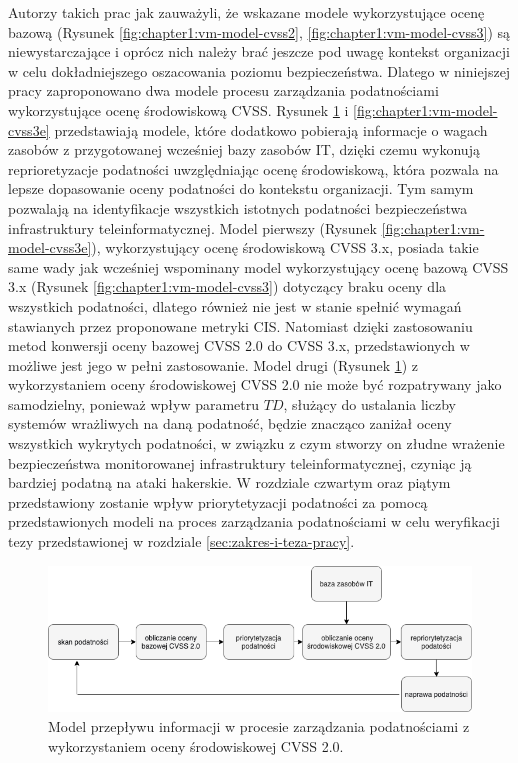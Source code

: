 \bigbreak
Autorzy takich prac jak \cite{fruhwirth2009improving, wang2015vulnerability, gallon2010impact} zauważyli, że wskazane modele wykorzystujące ocenę bazową (Rysunek \ref{fig:chapter1:vm-model-cvss2}, \ref{fig:chapter1:vm-model-cvss3}) są niewystarczające i oprócz nich należy brać jeszcze pod uwagę kontekst organizacji w celu dokładniejszego oszacowania poziomu bezpieczeństwa. Dlatego w niniejszej pracy zaproponowano dwa modele procesu zarządzania podatnościami wykorzystujące ocenę środowiskową CVSS. Rysunek \ref{fig:chapter1:vm-model-cvss2e} i \ref{fig:chapter1:vm-model-cvss3e} przedstawiają modele, które dodatkowo pobierają informacje o wagach zasobów z przygotowanej wcześniej bazy zasobów IT, dzięki czemu wykonują reprioretyzacje podatności uwzględniając ocenę środowiskową, która pozwala na lepsze dopasowanie oceny podatności do kontekstu organizacji. Tym samym pozwalają na identyfikacje wszystkich istotnych podatności bezpieczeństwa infrastruktury teleinformatycznej. Model pierwszy (Rysunek \ref{fig:chapter1:vm-model-cvss3e}), wykorzystujący ocenę środowiskową CVSS 3.x, posiada takie same wady jak wcześniej wspominany model wykorzystujący ocenę bazową CVSS 3.x (Rysunek \ref{fig:chapter1:vm-model-cvss3}) dotyczący braku oceny dla wszystkich podatności, dlatego również nie jest w stanie spełnić wymagań stawianych przez proponowane metryki CIS. Natomiast dzięki zastosowaniu metod konwersji oceny bazowej CVSS 2.0 do CVSS 3.x, przedstawionych w \cite{Nowa2109Conversion, Nowak-cldd-2021} możliwe jest jego w pełni zastosowanie. Model drugi (Rysunek \ref{fig:chapter1:vm-model-cvss2e}) z wykorzystaniem oceny środowiskowej CVSS 2.0 nie może być rozpatrywany jako samodzielny, ponieważ wpływ parametru $TD$, służący do ustalania liczby systemów wrażliwych na daną podatność, będzie znacząco zaniżał oceny wszystkich wykrytych podatności, w związku z czym stworzy on złudne wrażenie bezpieczeństwa monitorowanej infrastruktury teleinformatycznej, czyniąc ją bardziej podatną na ataki hakerskie. W rozdziale czwartym oraz piątym przedstawiony zostanie wpływ priorytetyzacji podatności za pomocą przedstawionych modeli na proces zarządzania podatnościami w celu weryfikacji tezy przedstawionej w rozdziale \ref{sec:zakres-i-teza-pracy}.

\begin{figure}[!ht]
\centering
\includegraphics[width=.9\textwidth]{Chapters/Wstep/vm-models/vm-model-cvss-e-2.png}
\caption{Model przepływu informacji w procesie zarządzania podatnościami z wykorzystaniem oceny środowiskowej CVSS 2.0.}
\label{fig:chapter1:vm-model-cvss2e}
\end{figure}


